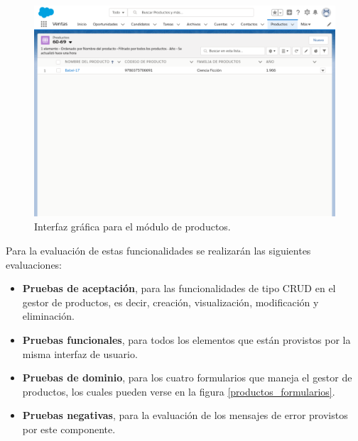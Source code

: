 \begin{figure}
\centering
\includegraphics[width=1.0\textwidth]{graphics/productos.eps}
\caption{Interfaz gráfica para el módulo de productos.}
\label{productos_web}
\end{figure}

Para la evaluación de estas funcionalidades se realizarán las siguientes
evaluaciones:

\begin{itemize}
\item \textbf{Pruebas de aceptación}, para las funcionalidades de tipo CRUD en
    el gestor de productos, es decir, creación, visualización, modificación y
    eliminación.
\item \textbf{Pruebas funcionales}, para todos los elementos que están provistos
    por la misma interfaz de usuario.
\item \textbf{Pruebas de dominio}, para los cuatro formularios que maneja el
    gestor de productos, los cuales pueden verse en la figura \ref{productos_formularios}.
\item \textbf{Pruebas negativas}, para la evaluación de los mensajes de
    error provistos por este componente.
\end{itemize}

